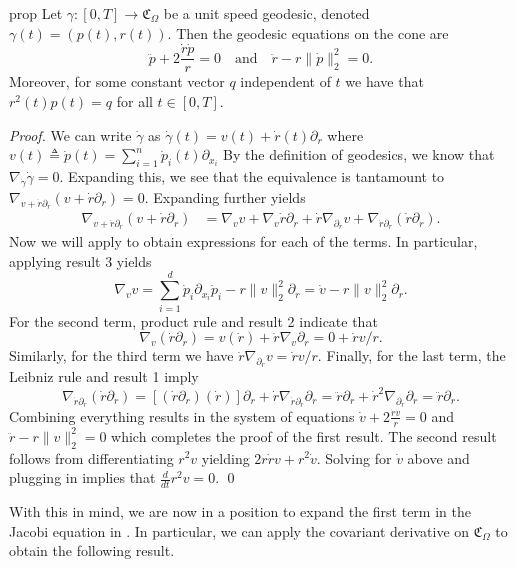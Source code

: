 \documentclass[11pt]{article}
\begin{document}
\begin{restatable}{prop}{} \label{cone geodesic equations via covariant deriv}
    Let $\gamma: [0, T] \rightarrow \mathfrak{C}_\Omega$ be a unit speed geodesic, denoted $\gamma(t) = \left(p(t), r(t)\right)$.
    Then the geodesic equations on the cone are 
    \[ \ddot p + 2\frac{\dot r \dot p}{r} = 0 \quad \text{and}\quad \ddot r  - r\|\dot p\|_2^2 = 0. \]
    Moreover, for some constant vector $q$ independent of $t$ we have that $r^2(t)p(t) = q$ for all $t \in [0, T]$.
\end{restatable}
\noindent \textit{Proof.} We can write $\dot \gamma$ as $\dot\gamma(t) =  v(t) + \dot r(t) \partial_r$ where $v(t) \triangleq \dot p(t) = \sum_{i = 1}^n\dot p_i(t) \partial_{x_i}$ By the definition of geodesics, we know that $\nabla_{\dot \gamma}\dot \gamma = 0$. Expanding this, we see that the equivalence is tantamount to $\nabla_{v + \dot r\partial_r}(v + \dot r \partial_r) = 0.$ Expanding further yields
\begin{align*}
    \nabla_{v + \dot r\partial_r}(v + \dot r \partial_r) &= \nabla_vv + \nabla_v \dot r \partial_r + \dot r \nabla_{\partial_r}v +  \nabla_{\dot r\partial_r}(\dot r \partial_r).
\end{align*}
Now we will apply  to obtain expressions for each of the terms. In particular, applying result 3 yields
\[\nabla_{v}v = \sum_{i = 1}^d\dot p_i \partial_{x_i}\dot p_i - r\|v\|_2^2 \partial_r = \dot v - r\|v\|_2^2\partial_r.\]
For the second term, product rule and result 2 indicate that 
\[\nabla_v (\dot r\partial_r) = v(\dot r) + \dot r \nabla_v\partial_r = 0 + \dot rv/r.\]
Similarly, for the third term we have $\dot r \nabla_{\partial_{r}}v = \dot rv/r$. Finally, for the last term, the Leibniz rule and result 1 imply 
\[\nabla_{\dot r\partial_r}(\dot r\partial_r) = [(\dot r\partial_r)(\dot r )]\partial_r +\dot r \nabla_{\dot r\partial _r}\partial_r = \ddot r \partial_r + \dot r^2\nabla _{\partial_r}\partial_r = \ddot r\partial_r.\]
Combining everything results in the system of equations $\dot v + 2\frac{\dot rv}{r} = 0$ and $\ddot r  - r\|v\|_2^2 = 0$ which completes the proof of the first result. The second result follows from differentiating $r^2v$ yielding $2r\dot rv + r^2\dot v.$ Solving for $\dot v$ above and plugging in implies that $\frac{d}{dt}r^2v = 0$. \qed{}

With this in mind, we are now in a position to expand the first term in the Jacobi equation in . In particular, we can apply the covariant derivative on $\mathfrak{C}_\Omega$ to obtain the following result.
\end{document}
